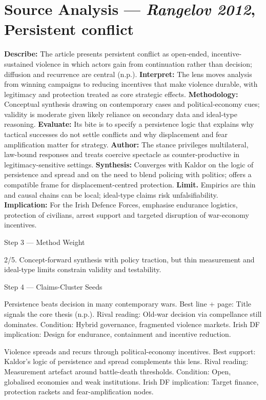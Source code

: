 \section*{Source Analysis — \textit{Rangelov 2012}, Persistent conflict}
\textbf{Describe:} The article presents persistent conflict as open-ended, incentive-sustained violence in which actors gain from continuation rather than decision; diffusion and recurrence are central (n.p.).
\textbf{Interpret:} The lens moves analysis from winning campaigns to reducing incentives that make violence durable, with legitimacy and protection treated as core strategic effects.
\textbf{Methodology:} Conceptual synthesis drawing on contemporary cases and political-economy cues; validity is moderate given likely reliance on secondary data and ideal-type reasoning.
\textbf{Evaluate:} Its bite is to specify a persistence logic that explains why tactical successes do not settle conflicts and why displacement and fear amplification matter for strategy.
\textbf{Author:} The stance privileges multilateral, law-bound responses and treats coercive spectacle as counter-productive in legitimacy-sensitive settings.
\textbf{Synthesis:} Converges with Kaldor on the logic of persistence and spread and on the need to blend policing with politics; offers a compatible frame for displacement-centred protection.
\textbf{Limit.} Empirics are thin and causal chains can be local; ideal-type claims risk unfalsifiability.
\textbf{Implication:} For the Irish Defence Forces, emphasise endurance logistics, protection of civilians, arrest support and targeted disruption of war-economy incentives.

Step 3 — Method Weight

2/5. Concept-forward synthesis with policy traction, but thin measurement and ideal-type limits constrain validity and testability.

Step 4 — Claims-Cluster Seeds

Persistence beats decision in many contemporary wars.
Best line + page: Title signals the core thesis (n.p.).
Rival reading: Old-war decision via compellance still dominates.
Condition: Hybrid governance, fragmented violence markets.
Irish DF implication: Design for endurance, containment and incentive reduction.

Violence spreads and recurs through political-economy incentives.
Best support: Kaldor’s logic of persistence and spread complements this lens.
Rival reading: Measurement artefact around battle-death thresholds.
Condition: Open, globalised economies and weak institutions.
Irish DF implication: Target finance, protection rackets and fear-amplification nodes.

